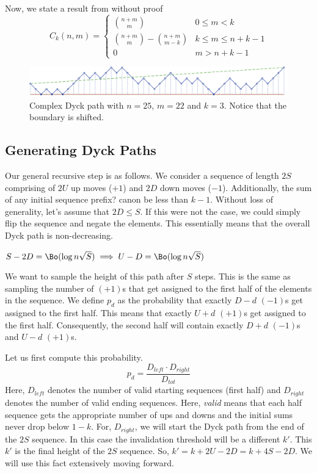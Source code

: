Now, we state a result from \cite{trap} without proof
$$
C_k(n,m)=
\begin{cases}
{n+m}\choose m &0\le m<k\\
{{n+m}\choose{m}} - {{n+m}\choose{m-k}} &k\le m\le n+k-1\\
0 &m>n+k-1
\end{cases}
$$

\begin{figure}[htbp]
    \centering
    \includegraphics[width=\textwidth]{dyck/complex_dyck_path.pdf}
    \caption{Complex Dyck path with $n = 25$, $m = 22$ and $k = 3$.
             Notice that the boundary is shifted.} \label{fig:complex_dyck}
\end{figure}

\subsection{Generating Dyck Paths}
Our general recursive step is as follows.
We consider a sequence of length $2S$ comprising of $2U$ up moves ($+1$) and $2D$ down moves ($-1$).
Additionally, the sum of any initial sequence {\color{red} prefix?} canon be less than $k-1$.
Without loss of generality, let's assume that $2D\le S$. If this were not the case,
we could simply flip the sequence and negate the elements.
This essentially means that the overall Dyck path is non-decreasing.

\begin{lemma}
$S-2D = \Bo(\log n\sqrt S) \implies U-D = \Bo(\log n\sqrt S)$
\label{lem:dyck_var0}
\end{lemma}

We want to sample the height of this path after $S$ steps.
This is the same as sampling the number of $(+1)$s that get assigned to the first half of the elements in the sequence.
We define $p_d$ as the probability that exactly $D-d$ $(-1)$s get assigned to the first half.
This means that exactly $U+d$ $(+1)$s get assigned to the first half.
Consequently, the second half will contain exactly $D+d$ $(-1)$s and $U-d$ $(+1)$s.


Let us first compute this probability.
$$
p_d = \frac{D_{left}\cdot D_{right}}{D_{tot}}
$$
Here, $D_{left}$ denotes the number of valid starting sequences (first half)
and $D_{right}$ denotes the number of valid ending sequences.
Here, \textit{valid} means that each half sequence gets the appropriate number of ups and downs
and the initial sums never drop below $1-k$.
For, $D_{right}$, we will start the Dyck path from the end of the $2S$ sequence.
In this case the invalidation threshold will be a different $k'$.
This $k'$ is the final height of the $2S$ sequence. So, $k'=k+2U-2D = k+4S-2D$.
We will use this fact extensively moving forward.


